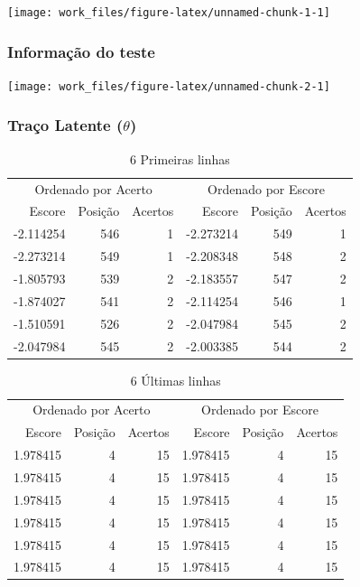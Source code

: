 \documentclass[]{article}
\begin{document}
\begin{center}\texttt{[image: work\_files/figure-latex/unnamed-chunk-1-1]} \end{center}

\subsubsection{Informação do teste}\label{informacao-do-teste}

\begin{center}\texttt{[image: work\_files/figure-latex/unnamed-chunk-2-1]} \end{center}

\subsubsection{\texorpdfstring{Traço Latente
(\(\theta\))}{Traço Latente (\textbackslash{}theta)}}\label{traco-latente-theta}

\begin{table}[!h]

\caption{\label{tab:tab-traço-latente1}6 Primeiras linhas}
\centering
\begin{tabular}[t]{rrrrrr}
\toprule
\multicolumn{3}{c}{Ordenado por Acerto} & \multicolumn{3}{c}{Ordenado por Escore} \\
\cmidrule(l{2pt}r{2pt}){1-3} \cmidrule(l{2pt}r{2pt}){4-6}
Escore & Posição & Acertos & Escore & Posição & Acertos\\
\midrule
-2.114254 & 546 & 1 & -2.273214 & 549 & 1\\
-2.273214 & 549 & 1 & -2.208348 & 548 & 2\\
-1.805793 & 539 & 2 & -2.183557 & 547 & 2\\
-1.874027 & 541 & 2 & -2.114254 & 546 & 1\\
-1.510591 & 526 & 2 & -2.047984 & 545 & 2\\
-2.047984 & 545 & 2 & -2.003385 & 544 & 2\\
\bottomrule
\end{tabular}
\end{table}

\begin{table}[!h]

\caption{\label{tab:tab-traço-latente2}6 Últimas linhas}
\centering
\begin{tabular}[t]{rrrrrr}
\toprule
\multicolumn{3}{c}{Ordenado por Acerto} & \multicolumn{3}{c}{Ordenado por Escore} \\
\cmidrule(l{2pt}r{2pt}){1-3} \cmidrule(l{2pt}r{2pt}){4-6}
Escore & Posição & Acertos & Escore & Posição & Acertos\\
\midrule
1.978415 & 4 & 15 & 1.978415 & 4 & 15\\
1.978415 & 4 & 15 & 1.978415 & 4 & 15\\
1.978415 & 4 & 15 & 1.978415 & 4 & 15\\
1.978415 & 4 & 15 & 1.978415 & 4 & 15\\
1.978415 & 4 & 15 & 1.978415 & 4 & 15\\
1.978415 & 4 & 15 & 1.978415 & 4 & 15\\
\bottomrule
\end{tabular}
\end{table}
\end{document}
